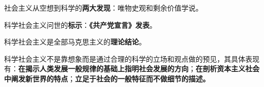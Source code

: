社会主义从空想到科学的\textbf{{两}{大发现}}：唯物史观和剩余价值学说。

{科学社会主义问世的}\textbf{{标示}}{：{\textbf{《共产党宣言》发表}}。}

{科学社会主义是全部马克思主义的}\textbf{{理论结论}}{。}

{科学社会主义不是靠想象而是通过合理的科学的立场和观点做的预见，其具体表现有：}\textbf{{在揭示人类发展一般规律的基础上指明社会发展的方向}}{；}\textbf{{在剖析资本主义社会中阐发新世界的特点}}{；}\textbf{{立足于社会的一般特征而不做细节的描述。}}
